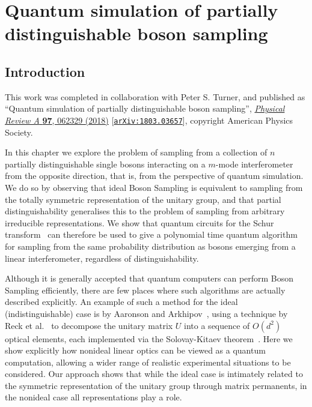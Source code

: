 \chapter{Quantum simulation of partially distinguishable boson sampling}
\label{chp:noisy_circuit}

\section{Introduction}

This work was completed in collaboration with Peter S. Turner, and published as ``Quantum simulation of partially distinguishable boson sampling'', \href{https://link.aps.org/doi/10.1103/PhysRevA.97.062329}{\textit{Physical Review A} \textbf{97}, 062329 (2018)} [{\tt \href{https://arxiv.org/abs/1803.03657}{arXiv:1803.03657}}], copyright American Physics Society.

In this chapter we explore the problem of sampling from a collection of $n$ partially distinguishable single bosons interacting on a $m$-mode interferometer from the opposite direction, that is, from the perspective of quantum simulation. 
We do so by observing that ideal Boson Sampling is equivalent to sampling from the totally symmetric representation of the unitary group, and that partial distinguishability generalises this to the problem of sampling from arbitrary irreducible representations.
We show that quantum circuits for the Schur transform~\cite{bacon2007} can therefore be used to give a polynomial time quantum algorithm for sampling from the same probability distribution as bosons emerging from a linear interferometer, regardless of distinguishability.

Although it is generally accepted that quantum computers can perform Boson Sampling efficiently, there are few places where such algorithms are actually described explicitly. 
An example of such a method for the ideal (indistinguishable) case is by Aaronson and Arkhipov~\cite{aaronson2011}, using a technique by Reck et al.~\cite{reck1994} to decompose the unitary matrix $U$ into a sequence of $O(d^2)$ optical elements, each implemented via the Solovay-Kitaev theorem~\cite{nielsen2010}. 
Here we show explicitly how nonideal linear optics can be viewed as a quantum computation, allowing a wider range of realistic experimental situations to be considered.
Our approach shows that while the ideal case is intimately related to the symmetric representation of the unitary group through matrix permanents, in the nonideal case all representations play a role.

